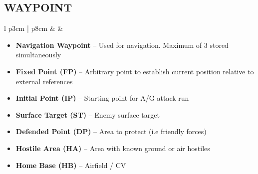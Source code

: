 \documentclass[fontHelvetica]{TechCheck}
\begin{document}
	\subsection{WAYPOINT}
	\begin{center}
		\begin{longtable}{l p{3cm} | p{8cm}}
			\toprule
			\textbf{\textbullet} &   &
			\begin{minipage}[t]{\linewidth}
				\vspace{-7pt}
				\begin{itemize}
					\item \textbf{Navigation Waypoint} -- Used for navigation. Maximum of 3 stored simultaneously
					\item \textbf{Fixed Point (FP)} -- Arbitrary point to establish current position relative to external references
					\item \textbf{Initial Point (IP)} -- Starting point for A/G attack run
					\item \textbf{Surface Target (ST)} -- Enemy surface target
					\item \textbf{Defended Point (DP)} -- Area to protect (i.e friendly forces)
					\item \textbf{Hostile Area (HA)} -- Area with known ground or air hostiles
					\item \textbf{Home Base (HB)} -- Airfield / CV
				\end{itemize}
			\end{minipage} \\
			\bottomrule
		\end{longtable}
	\end{center}
\end{document}
